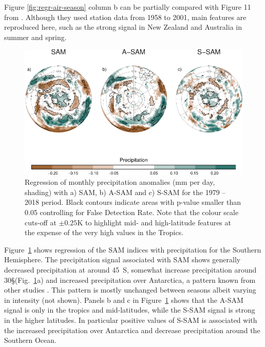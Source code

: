 \documentclass[smallextended]{svjour3}       %
\begin{document}
Figure \ref{fig:regr-air-season} column b can be partially compared with Figure 11 from \citet{fogt2012}.
Although they used station data from 1958 to 2001, main features are reproduced here, such as the strong signal in New Zealand and Australia in summer and spring.



\begin{figure}
\includegraphics{global-pp-1} \caption{Regression of monthly precipitation anomalies (mm per day, shading) with a) SAM, b) A\nobreakdash-SAM and c) S\nobreakdash-SAM for the 1979 -- 2018 period. Black contours indicate areas with p-value smaller than 0.05 controlling for False Detection Rate. Note that the colour scale cuts-off at \(\pm0.25 \mathrm{K}\) to highlight mid- and high-latitude features at the expense of the very high values in the Tropics.}\label{fig:global-pp}
\end{figure}

Figure~\ref{fig:global-pp} shows regression of the SAM indices with precipitation for the Southern Hemisphere. The precipitation signal associated with SAM shows generally decreased precipitation at around 45\degree~S, somewhat increase precipitation around 30\degree\S (Fig.~\ref{fig:global-pp}a) and increased precipitation over Antarctica, a pattern known from other studies \citep[e.g.][]{hendon2014}.
This pattern is mostly unchanged between seasons albeit varying in intensity (not shown).
Panels b and c in Figure~\ref{fig:global-pp} shows that the A\nobreakdash-SAM signal is only in the tropics and mid-latitudes, while the S\nobreakdash-SAM signal is strong in the higher latitudes.
In particular positive values of S\nobreakdash-SAM is associated with the increased precipitation over Antarctica and decrease precipitation around the Southern Ocean.
\end{document}
